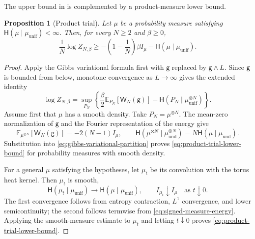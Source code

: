 \documentclass[11pt,reqno]{amsart}
\numberwithin{equation}{section}
\theoremstyle{plain}
\newtheorem{prop}[prop]{Proposition}
\theoremstyle{definition}
\newcommand{\E}{\mathbb E}
\newcommand{\be}{\beta}
\newcommand{\g}{\mathsf g}
\newcommand{\Hr}{\mathsf H}
\newcommand{\muunif}{\mu_{\mathrm{unif}}}
\begin{document}
The upper bound in  is complemented by a product-measure lower bound.

\begin{prop}[Product trial]
\label{prop:product-trial}
Let $\mu$ be a probability measure satisfying $\Hr(\mu\mid\muunif)<\infty$.  Then, for every $N\geq2$ and $\be\geq0$,
\begin{equation}
 \frac1N\log Z_{N,\be}
 \geq-\left(1-\frac1N\right)\be I_{\mu}
 -\Hr(\mu\mid\muunif).
 \label{eq:product-trial-lower-bound}
\end{equation}
\end{prop}

\begin{proof}
Apply the Gibbs variational formula first with $\g$ replaced by $\g\wedge L$.  Since $\g$ is bounded from below, monotone convergence as $L\to\infty$ gives the extended identity
\begin{equation}
 \log Z_{N,\be}
 =\sup_{P_N}\left\{
 \frac\be2\E_{P_N}[\mathsf W_N(\g)]
 -\Hr(P_N\mid\muunif^{\otimes N})\right\}.
 \label{eq:gibbs-variational-partition}
\end{equation}
Assume first that $\mu$ has a smooth density.  Take $P_N=\mu^{\otimes N}$.  The mean-zero normalization of $\g$ and the Fourier representation of the energy give
\begin{equation}
 \E_{\mu^{\otimes N}}[\mathsf W_N(\g)]
 =-2(N-1)I_{\mu},
 \qquad
 \Hr(\mu^{\otimes N}\mid \muunif^{\otimes N})
 =N\Hr(\mu\mid\muunif).
 \label{eq:product-trial-energy-entropy}
\end{equation}
Substitution into \eqref{eq:gibbs-variational-partition} proves \eqref{eq:product-trial-lower-bound} for probability measures with smooth density.

For a general $\mu$ satisfying the hypotheses, let $\mu_t$ be its convolution with the torus heat kernel.  Then $\mu_t$ is smooth,
\begin{equation}
 \Hr(\mu_t\mid\muunif)\longrightarrow\Hr(\mu\mid\muunif),
 \qquad
 I_{\mu_t}\downarrow I_{\mu}
 \quad\text{as }t\downarrow0.
 \label{eq:product-trial-heat-approximation}
\end{equation}
The first convergence follows from entropy contraction, $L^1$ convergence, and lower semicontinuity; the second follows termwise from \eqref{eq:signed-measure-energy}.  Applying the smooth-measure estimate to $\mu_t$ and letting $t\downarrow0$ proves \eqref{eq:product-trial-lower-bound}.
\end{proof}
\end{document}
